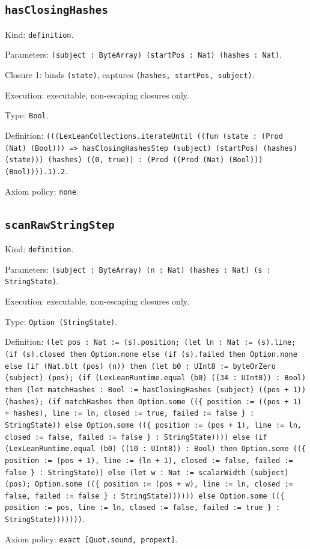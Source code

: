 \documentclass[11pt]{article}
\begin{document}
\subsection*{\texttt{hasClosingHashes}}
\noindent Kind: \texttt{definition}.\par
\noindent Parameters: \texttt{(subject : ByteArray) (startPos : Nat) (hashes : Nat)}.\par
\noindent Closure 1: binds \texttt{(state)}, captures \texttt{(hashes, startPos, subject)}.\par
\noindent Execution: executable, non-escaping closures only.\par
\noindent Type: \texttt{Bool}.\par
\noindent Definition: \texttt{(((LexLeanCollections.iterateUntil ((fun (state : (Prod (Nat) (Bool))) => hasClosingHashesStep (subject) (startPos) (hashes) (state))) (hashes) ((0, true)) : (Prod ((Prod (Nat) (Bool))) (Bool)))).1).2}.\par
\noindent Axiom policy: \texttt{none}.\par
\subsection*{\texttt{scanRawStringStep}}
\noindent Kind: \texttt{definition}.\par
\noindent Parameters: \texttt{(subject : ByteArray) (n : Nat) (hashes : Nat) (s : StringState)}.\par
\noindent Execution: executable, non-escaping closures only.\par
\noindent Type: \texttt{Option (StringState)}.\par
\noindent Definition: \texttt{(let pos : Nat := (s).position; (let ln : Nat := (s).line; (if (s).closed then Option.none else (if (s).failed then Option.none else (if (Nat.blt (pos) (n)) then (let b0 : UInt8 := byteOrZero (subject) (pos); (if (LexLeanRuntime.equal (b0) ((34 : UInt8)) : Bool) then (let matchHashes : Bool := hasClosingHashes (subject) ((pos + 1)) (hashes); (if matchHashes then Option.some ((\{ position := ((pos + 1) + hashes), line := ln, closed := true, failed := false \} : StringState)) else Option.some ((\{ position := (pos + 1), line := ln, closed := false, failed := false \} : StringState)))) else (if (LexLeanRuntime.equal (b0) ((10 : UInt8)) : Bool) then Option.some ((\{ position := (pos + 1), line := (ln + 1), closed := false, failed := false \} : StringState)) else (let w : Nat := scalarWidth (subject) (pos); Option.some ((\{ position := (pos + w), line := ln, closed := false, failed := false \} : StringState)))))) else Option.some ((\{ position := pos, line := ln, closed := false, failed := true \} : StringState)))))))}.\par
\noindent Axiom policy: \texttt{exact [Quot.sound, propext]}.\par
\end{document}
